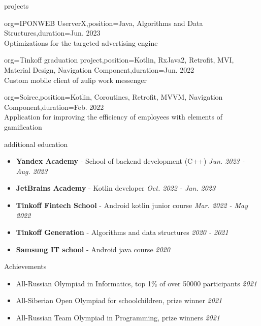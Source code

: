 \documentclass{resume}
\begin{document}
\begin{ResumeSection}{projects}
\begin{ResumeSubsection}{org=IPONWEB UserverX,position={Java, Algorithms and Data Structures},duration={Jun. 2023}} \\
Optimizations for the targeted advertising engine \vspace{4pt}

\end{ResumeSubsection}

\begin{ResumeSubsection}{org=Tinkoff graduation project,position={Kotlin, RxJava2, Retrofit, MVI, Material Design, Navigation Component},duration={Jun. 2022}} \\
Custom mobile client of zulip work messenger \vspace{4pt}

\end{ResumeSubsection}
\begin{ResumeSubsection}{org=Soiree,position={Kotlin, Coroutines, Retrofit, MVVM, Navigation Component},duration={Feb. 2022}} \\
Application for improving the efficiency of employees with elements of gamification \vspace{4pt}
\end{ResumeSubsection}
\end{ResumeSection}

\begin{ResumeSection}{additional education}
    \newcommand{\school}[2]{\textbf{#1} - #2}
    \begin{itemize}
        \item \school{Yandex Academy}{School of backend development (C++)} \em\hfill{Jun. 2023 - Aug. 2023}\em
        \item \school{JetBrains Academy}{Kotlin developer} \em\hfill{Oct. 2022 - Jan. 2023}\em
        \item \school{Tinkoff Fintech School}{Android kotlin junior course}  \em\hfill{Mar. 2022 - May 2022}\em
        \item \school{Tinkoff Generation}{Algorithms and data structures} \em\hfill{2020 - 2021}\em
        \item \school{Samsung IT school}{Android java course} \em\hfill{2020}\em
    \end{itemize}
\end{ResumeSection}
\begin{ResumeSection}{Achievements}
\begin{itemize}
  \item All-Russian Olympiad in Informatics, top 1\% of over 50000 participants \em\hfill{2021}\em
  \item All-Siberian Open Olympiad for schoolchildren, prize winner \em\hfill{2021}\em
  \item All-Russian Team Olympiad in Programming, prize winners \em\hfill{2021}\em
\end{itemize}
\end{ResumeSection}
\end{document}
